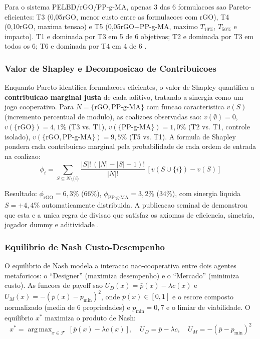 \documentclass[11pt,a4paper,oneside]{article}
\DeclareMathOperator*{\argmax}{arg\,max}
\begin{document}
Para o sistema PELBD/rGO/PP-g-MA, apenas 3 das 6 formulacoes sao Pareto-eficientes: T3
(0,05rGO, menor custo entre as formulacoes com rGO), T4 (0,10rGO, maxima tensao) e T5
(0,05rGO+PP-g-MA, maximo $T_{10\%}$, $T_{50\%}$ e impacto). T1 e dominada por T3 em 5 de 6
objetivos; T2 e dominada por T3 em todos os 6; T6 e dominada por T4 em 4 de 6 \cite{Pareto1906}.

\subsubsection{Valor de Shapley e Decomposicao de Contribuicoes}

Enquanto Pareto identifica formulacoes eficientes, o valor de Shapley \cite{Shapley1953}
quantifica a {\bfseries contribuicao marginal justa} de cada aditivo, tratando a sinergia como
um jogo cooperativo. Para $N = \{\text{rGO}, \text{PP-g-MA}\}$ com funcao caracteristica $v(S)$
(incremento percentual de modulo), as coalizoes observadas sao: $v(\emptyset)=0$,
$v(\{\text{rGO}\})=4{,}1\%$ (T3 vs. T1), $v(\{\text{PP-g-MA}\})=1{,}0\%$ (T2 vs. T1, controle
isolado), $v(\{\text{rGO},\text{PP-g-MA}\})=9{,}5\%$ (T5 vs. T1). A formula de Shapley pondera
cada contribuicao marginal pela probabilidade de cada ordem de entrada na coalizao:
\begin{equation}
\phi_i = \sum_{S \subseteq N \setminus \{i\}} \frac{|S|!\,(|N| - |S| - 1)!}{|N|!}\,[v(S \cup \{i\}) - v(S)]
\label{eq:shapley_gt}
\end{equation}

Resultado: $\phi_{\text{rGO}}{=}6{,}3\%$ (66\%), $\phi_{\text{PP-g-MA}}{=}3{,}2\%$ (34\%),
com sinergia liquida $S{=}{+}4{,}4\%$ automaticamente distribuida. A publicacao seminal de
\citet{Shapley1953} demonstrou que esta e a unica regra de divisao que satisfaz os axiomas
de eficiencia, simetria, jogador dummy e aditividade \cite{Shapley1953}.

\subsubsection{Equilibrio de Nash Custo-Desempenho}

O equilibrio de Nash \cite{Nash1950} modela a interacao nao-cooperativa entre dois agentes
metaforicos: o ``Designer'' (maximiza desempenho) e o ``Mercado'' (minimiza custo). As funcoes
de payoff sao $U_D(x) = \bar{p}(x) - \lambda c(x)$ e $U_M(x) = -(\bar{p}(x) - p_{\min})^2$,
onde $\bar{p}(x)\in[0{,}1]$ e o escore composto normalizado (media de 6 propriedades) e
$p_{\min}{=}0{,}7$ e o limiar de viabilidade. O equilibrio $x^*$ maximiza o produto de Nash:
\begin{equation}
x^* = \argmax_{x \in \mathcal{F}}\,[\bar{p}(x) - \lambda c(x)],\quad U_D = \bar{p} - \lambda c,\quad U_M = -(\bar{p} - p_{\min})^2
\label{eq:nash_gt}
\end{equation}
\end{document}
